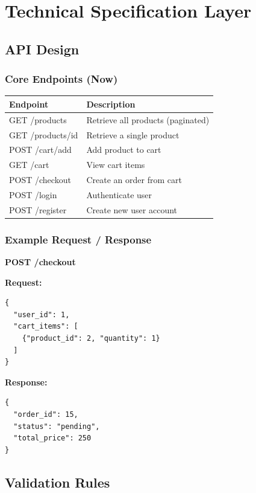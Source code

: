 \documentclass[12pt,a4paper]{article}
\begin{document}
\section{Technical Specification Layer}

\subsection{API Design}

\subsubsection{Core Endpoints (Now)}

\begin{longtable}{|p{5cm}|p{9cm}|}
\hline
\textbf{Endpoint} & \textbf{Description} \\
\hline
GET /products & Retrieve all products (paginated) \\
\hline
GET /products/{id} & Retrieve a single product \\
\hline
POST /cart/add & Add product to cart \\
\hline
GET /cart & View cart items \\
\hline
POST /checkout & Create an order from cart \\
\hline
POST /login & Authenticate user \\
\hline
POST /register & Create new user account \\
\hline
\end{longtable}

\subsubsection{Example Request / Response}

\textbf{POST /checkout}

\textbf{Request:}
\begin{verbatim}
{
  "user_id": 1,
  "cart_items": [
    {"product_id": 2, "quantity": 1}
  ]
}
\end{verbatim}

\textbf{Response:}
\begin{verbatim}
{
  "order_id": 15,
  "status": "pending",
  "total_price": 250
}
\end{verbatim}

\subsection{Validation Rules}
\end{document}
